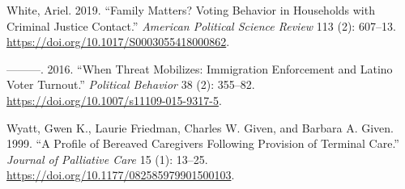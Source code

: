 \documentclass[
  12pt,
]{article}
\newlength{\cslhangindent}
\newenvironment{cslreferences}%
  {\setlength{\parindent}{0pt}%
  \everypar{\setlength{\hangindent}{\cslhangindent}}\ignorespaces}%
  {\par}
\begin{document}
\begin{cslreferences}
\leavevmode\hypertarget{ref-White2019a}{}%
White, Ariel. 2019. ``Family Matters? Voting Behavior in Households with Criminal Justice Contact.'' \emph{American Political Science Review} 113 (2): 607--13. \url{https://doi.org/10.1017/S0003055418000862}.

\leavevmode\hypertarget{ref-White2016}{}%
---------. 2016. ``When Threat Mobilizes: Immigration Enforcement and Latino Voter Turnout.'' \emph{Political Behavior} 38 (2): 355--82. \url{https://doi.org/10.1007/s11109-015-9317-5}.

\leavevmode\hypertarget{ref-Wyatt1999}{}%
Wyatt, Gwen K., Laurie Friedman, Charles W. Given, and Barbara A. Given. 1999. ``A Profile of Bereaved Caregivers Following Provision of Terminal Care.'' \emph{Journal of Palliative Care} 15 (1): 13--25. \url{https://doi.org/10.1177/082585979901500103}.
\end{cslreferences}
\end{document}
